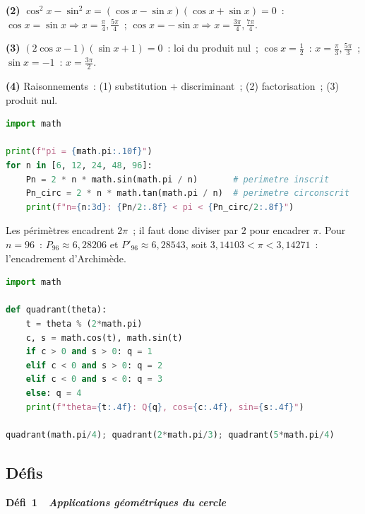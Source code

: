 \textbf{(2)} $\cos^2x-\sin^2x=(\cos x-\sin x)(\cos x+\sin x)=0$~:
$\cos x=\sin x\Rightarrow x=\frac{\pi}{4},\frac{5\pi}{4}$~; $\cos x=-\sin x\Rightarrow x=\frac{3\pi}{4},\frac{7\pi}{4}$.

\textbf{(3)} $(2\cos x-1)(\sin x+1)=0$~: loi du produit nul~;
$\cos x=\frac{1}{2}$~: $x=\frac{\pi}{3},\frac{5\pi}{3}$~; $\sin x=-1$~: $x=\frac{3\pi}{2}$.

\textbf{(4)} Raisonnements~: (1) substitution + discriminant~; (2) factorisation~; (3) produit nul.


\begin{lstlisting}[language=Python]
import math

print(f"pi = {math.pi:.10f}")
for n in [6, 12, 24, 48, 96]:
    Pn = 2 * n * math.sin(math.pi / n)       # perimetre inscrit
    Pn_circ = 2 * n * math.tan(math.pi / n)  # perimetre circonscrit
    print(f"n={n:3d}: {Pn/2:.8f} < pi < {Pn_circ/2:.8f}")
\end{lstlisting}
Les p\'erim\`etres encadrent $2\pi$~; il faut donc diviser par $2$ pour encadrer $\pi$.
Pour $n=96$~: $P_{96}\approx6{,}28206$ et $P'_{96}\approx6{,}28543$, soit $3{,}14103<\pi<3{,}14271$~: l'encadrement d'Archim\`ede.


\begin{lstlisting}[language=Python]
import math

def quadrant(theta):
    t = theta % (2*math.pi)
    c, s = math.cos(t), math.sin(t)
    if c > 0 and s > 0: q = 1
    elif c < 0 and s > 0: q = 2
    elif c < 0 and s < 0: q = 3
    else: q = 4
    print(f"theta={t:.4f}: Q{q}, cos={c:.4f}, sin={s:.4f}")

quadrant(math.pi/4); quadrant(2*math.pi/3); quadrant(5*math.pi/4)
\end{lstlisting}

\subsection*{D\'efis}

\noindent{}
{\color{BO}\bfseries\small D\'efi~1~\textendash\ \textit{Applications g\'eom\'etriques du cercle}}
\par\smallskip

